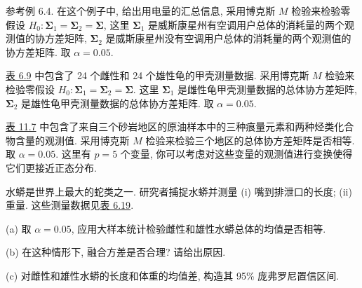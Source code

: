 \quad 参考例 6.4. 在这个例子中, 给出用电量的汇总信息, 采用博克斯 $M$ 检验来检验零假设 $H_0: \boldsymbol{\Sigma}_1=\boldsymbol{\Sigma}_2=\boldsymbol{\Sigma}$, 这里 $\boldsymbol{\Sigma}_1$ 是威斯康星州有空调用户总体的消耗量的两个观测值的协方差矩阵, $\boldsymbol{\Sigma}_2$ 是威斯康星州没有空调用户总体的消耗量的两个观测值的协方差矩阵. 取 $\alpha=0.05$.

\quad \hyperref[tab:6.9]{表 6.9} 中包含了 24 个雌性和 24 个雄性龟的甲壳测量数据. 采用博克斯 $M$ 检验来检验零假设 $H_0: \boldsymbol{\Sigma}_1=\boldsymbol{\Sigma}_2=\boldsymbol{\Sigma}$. 这里 $\boldsymbol{\Sigma}_1$ 是雌性龟甲壳测量数据的总体协方差矩阵, $\boldsymbol{\Sigma}_2$ 是雄性龟甲壳测量数据的总体协方差矩阵. 取 $\alpha=0.05$.

\quad \hyperref[tab:11.7]{表 11.7} 中包含了来自三个砂岩地区的原油样本中的三种痕量元素和两种烃类化合物含量的观测值. 采用博克斯 $M$ 检验来检验三个地区的总体协方差矩阵是否相等. 取 $\alpha=0.05$. 这里有 $p=5$ 个变量, 你可以考虑对这些变量的观测值进行变换使得它们更接近正态分布.

\quad 水蟒是世界上最大的蛇类之一. 研究者捕捉水蟒并测量 (i) 嘴到排泄口的长度; (ii) 重量. 这些测量数据见\hyperref[tab:6.19]{表 6.19}.

\noindent (a) 取 $\alpha=0.05$, 应用大样本统计检验雌性和雄性水蟒总体的均值是否相等.

\noindent (b) 在这种情形下, 融合方差是否合理? 请给出原因.

\noindent (c) 对雌性和雄性水蟒的长度和体重的均值差, 构造其 95\% 庞弗罗尼置信区间.
